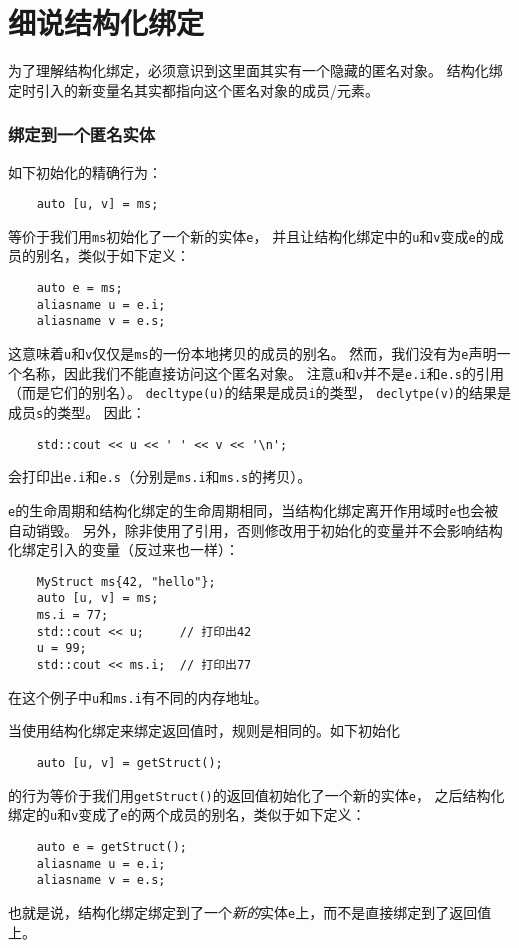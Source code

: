 \section{细说结构化绑定}
为了理解结构化绑定，必须意识到这里面其实有一个隐藏的匿名对象。
结构化绑定时引入的新变量名其实都指向这个匿名对象的成员/元素。

\subsubsection{绑定到一个匿名实体}
如下初始化的精确行为：
\begin{lstlisting}
    auto [u, v] = ms;
\end{lstlisting}
等价于我们用\texttt{ms}初始化了一个新的实体\texttt{e}，
并且让结构化绑定中的\texttt{u}和\texttt{v}变成\texttt{e}的成员的别名，类似于如下定义：
\begin{lstlisting}
    auto e = ms;
    aliasname u = e.i;
    aliasname v = e.s;
\end{lstlisting}
这意味着\texttt{u}和\texttt{v}仅仅是\texttt{ms}的一份本地拷贝的成员的别名。
然而，我们没有为\texttt{e}声明一个名称，因此我们不能直接访问这个匿名对象。
注意\texttt{u}和\texttt{v}并不是\texttt{e.i}和\texttt{e.s}的引用（而是它们的别名）。
\texttt{decltype(u)}的结果是成员\texttt{i}的类型，
\texttt{declytpe(v)}的结果是成员\texttt{s}的类型。
因此：
\begin{lstlisting}
    std::cout << u << ' ' << v << '\n';
\end{lstlisting}
会打印出\texttt{e.i}和\texttt{e.s}（分别是\texttt{ms.i}和\texttt{ms.s}的拷贝）。

\texttt{e}的生命周期和结构化绑定的生命周期相同，当结构化绑定离开作用域时\texttt{e}也会被自动销毁。
另外，除非使用了引用，否则修改用于初始化的变量并不会影响结构化绑定引入的变量（反过来也一样）：
\begin{lstlisting}
    MyStruct ms{42, "hello"};
    auto [u, v] = ms;
    ms.i = 77;
    std::cout << u;     // 打印出42
    u = 99;
    std::cout << ms.i;  // 打印出77
\end{lstlisting}
在这个例子中\texttt{u}和\texttt{ms.i}有不同的内存地址。

当使用结构化绑定来绑定返回值时，规则是相同的。如下初始化
\begin{lstlisting}
    auto [u, v] = getStruct();
\end{lstlisting}
的行为等价于我们用\texttt{getStruct()}的返回值初始化了一个新的实体\texttt{e}，
之后结构化绑定的\texttt{u}和\texttt{v}变成了\texttt{e}的两个成员的别名，类似于如下定义：
\begin{lstlisting}
    auto e = getStruct();
    aliasname u = e.i;
    aliasname v = e.s;
\end{lstlisting}
也就是说，结构化绑定绑定到了一个\emph{新的}实体\texttt{e}上，而不是直接绑定到了返回值上。

